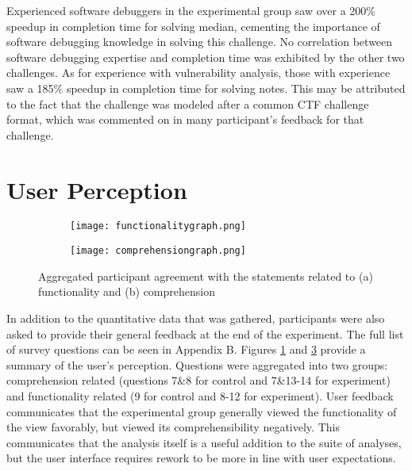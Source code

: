Experienced software debuggers in the experimental group saw over a 200\% speedup in completion time for solving median, cementing the importance of software debugging knowledge in solving this challenge. No correlation between software debugging expertise and completion time was exhibited by the other two challenges. As for experience with vulnerability analysis, those with experience saw a 185\% speedup in completion time for solving notes. This may be attributed to the fact that the challenge was modeled after a common CTF challenge format, which was commented on in many participant's feedback for that challenge. 

\section{User Perception}
\begin{figure}[!ht]
    \centering
    \begin{subfigure}[a]{0.75\textwidth}
        \texttt{[image: functionalitygraph.png]}
        \caption{}
        \label{fig:functionality}
    \end{subfigure}
    
    \begin{subfigure}[b]{0.75\textwidth}
        \centering
        \texttt{[image: comprehensiongraph.png]}
        \caption{}
        \label{fig:comprehension}
    \end{subfigure}
    \caption{Aggregated participant agreement with the statements related to (a) functionality and (b) comprehension}
\end{figure}
In addition to the quantitative data that was gathered, participants were also asked to provide their general feedback at the end of the experiment. The full list of survey questions can be seen in Appendix B. Figures \ref{fig:functionality} and \ref{fig:comprehension} provide a summary of the user's perception. Questions were aggregated into two groups: comprehension related (questions 7\&8 for control and 7\&13-14 for experiment) and functionality related (9 for control and 8-12 for experiment). User feedback communicates that the experimental group generally viewed the functionality of the view favorably, but viewed its comprehensibility negatively. This communicates that the analysis itself is a useful addition to the suite of  analyses, but the user interface requires rework to be more in line with user expectations. 

